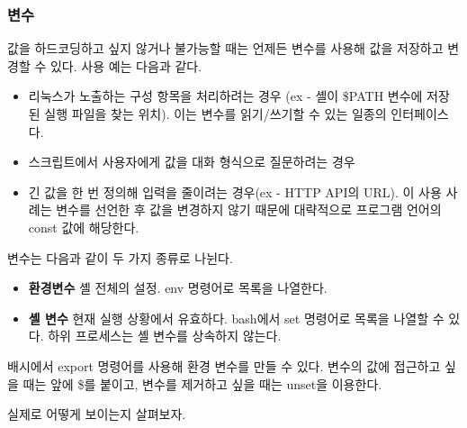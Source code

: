 \subsubsection*{변수}
\begin{flushleft}
    값을 하드코딩하고 싶지 않거나 불가능할 때는 언제든 변수를 사용해 값을 저장하고 변경할 수 있다.
    사용 예는 다음과 같다.
    \begin{itemize}
        \item 리눅스가 노출하는 구성 항목을 처리하려는 경우
            (ex - 셸이 \$PATH 변수에 저장된 실행 파일을 찾는 위치).
            이는 변수를 읽기/쓰기할 수 있는 일종의 인터페이스다.
        \item 스크립트에서 사용자에게 값을 대화 형식으로 질문하려는 경우 
        \item 긴 값을 한 번 정의해 입력을 줄이려는 경우(ex - HTTP API의 URL).
            이 사용 사례는 변수를 선언한 후 값을 변경하지 않기 때문에
            대략적으로 프로그램 언어의 const 값에 해당한다.
    \end{itemize}
\end{flushleft}

\begin{flushleft}
    변수는 다음과 같이 두 가지 종류로 나뉜다.
    \begin{itemize}
        \item \textbf{환경변수}\newline
            셸 전체의 설정.
            env 명령어로 목록을 나열한다.
        \item \textbf{셸 변수}\newline
            현재 실행 상황에서 유효하다.
            bash에서 set 명령어로 목록을 나열할 수 있다.
            하위 프로세스는 셸 변수를 상속하지 않는다.
    \end{itemize}
\end{flushleft}

\begin{flushleft}
    배시에서 export 명령어를 사용해 환경 변수를 만들 수 있다.
    변수의 값에 접근하고 싶을 때는 앞에 \$를 붙이고,
    변수를 제거하고 싶을 때는 unset을 이용한다.
\end{flushleft}

\begin{flushleft}
    실제로 어떻게 보이는지 살펴보자.
\end{flushleft}

